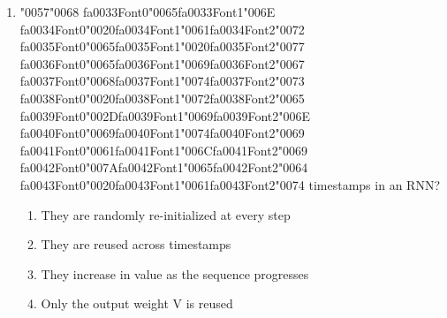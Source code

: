 \documentclass[12pt]{article}
\begin{document}
\begin{enumerate}[label=Q\arabic*.]
\item {\char"0057}{\char"0068} {\csname fa0033Font0\endcsname\char"0065}{\csname fa0033Font1\endcsname\char"006E} {\csname fa0034Font0\endcsname\char"0020}{\csname fa0034Font1\endcsname\char"0061}{\csname fa0034Font2\endcsname\char"0072} {\csname fa0035Font0\endcsname\char"0065}{\csname fa0035Font1\endcsname\char"0020}{\csname fa0035Font2\endcsname\char"0077} {\csname fa0036Font0\endcsname\char"0065}{\csname fa0036Font1\endcsname\char"0069}{\csname fa0036Font2\endcsname\char"0067} {\csname fa0037Font0\endcsname\char"0068}{\csname fa0037Font1\endcsname\char"0074}{\csname fa0037Font2\endcsname\char"0073} {\csname fa0038Font0\endcsname\char"0020}{\csname fa0038Font1\endcsname\char"0072}{\csname fa0038Font2\endcsname\char"0065} {\csname fa0039Font0\endcsname\char"002D}{\csname fa0039Font1\endcsname\char"0069}{\csname fa0039Font2\endcsname\char"006E} {\csname fa0040Font0\endcsname\char"0069}{\csname fa0040Font1\endcsname\char"0074}{\csname fa0040Font2\endcsname\char"0069} {\csname fa0041Font0\endcsname\char"0061}{\csname fa0041Font1\endcsname\char"006C}{\csname fa0041Font2\endcsname\char"0069} {\csname fa0042Font0\endcsname\char"007A}{\csname fa0042Font1\endcsname\char"0065}{\csname fa0042Font2\endcsname\char"0064} {\csname fa0043Font0\endcsname\char"0020}{\csname fa0043Font1\endcsname\char"0061}{\csname fa0043Font2\endcsname\char"0074} timestamps in an RNN?
\begin{enumerate}[label=(\Alph*)]
    \item They are randomly re-initialized at every step
    \item They are reused across timestamps
    \item They increase in value as the sequence progresses
    \item Only the output weight V is reused
\end{enumerate}

\end{enumerate}
\end{document}
